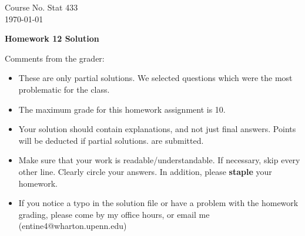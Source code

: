 \documentclass[10pt,a4paper]{article}
\begin{document}
\begin{flushleft}
Course No. Stat 433 \\
\today
\end{flushleft}

\begin{center}
{\Large{\bf  Homework 12 Solution}}
\end{center}

\textcolor[rgb]{0.98,0.00,0.00}{Comments from the grader:}
\begin{itemize}
    \item \textcolor[rgb]{0.98,0.00,0.00}{These are only partial solutions.  We selected
    questions which were the most problematic for the class.}
    \item \textcolor[rgb]{0.98,0.00,0.00}{The maximum grade for this homework assignment is 10.}
    \item \textcolor[rgb]{0.98,0.00,0.00}{Your solution should contain explanations, and not just
    final answers. Points will be deducted if partial solutions.
    are submitted.}
    \item \textcolor[rgb]{0.98,0.00,0.00}{Make sure that your work is readable/understandable.  If necessary, skip every other line.  Clearly circle your answers.  In addition, please {\bf staple} your homework.}
    \item \textcolor[rgb]{0.98,0.00,0.00}{If you notice a typo in the solution file or have a problem with the homework
    grading, please come by my office hours, or email me (entine4@wharton.upenn.edu)}

\end{itemize}
\end{document}
